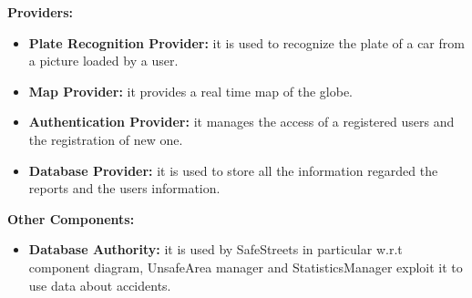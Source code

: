 \documentclass[../RASD.tex]{subfiles}
\begin{document}
    \textbf{Providers:}
    \\
    \begin{itemize}
        \item \textbf{Plate Recognition Provider:} it is used to recognize the plate of a car from a picture loaded by a user.
        \item \textbf{Map Provider:} it provides a real time map of the globe.
        \item \textbf{Authentication Provider:} it manages the access of a registered users and the registration of new one.
        \item \textbf{Database Provider:} it is used to store all the information regarded the reports and the users information.
    \end{itemize}
    \textbf{Other Components:}
    \\
    \begin{itemize}
        \item \textbf{Database Authority:} it is used by SafeStreets in particular w.r.t component diagram, UnsafeArea manager and StatisticsManager
        exploit it to use data about accidents.
    \end{itemize}
    \newpage
\end{document}
